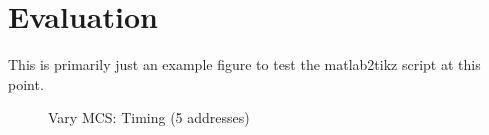 
\chapter{Evaluation}\label{ch:evaluation}

\glsresetall %


This is primarily just an example figure to test the matlab2tikz script at this point.\\

\begin{figure}[H]
	\centering
	\setlength\figureheight{5cm}
	\setlength{}
	
	\caption[vary\_mcs-timing-5\_addresses]{Vary MCS: Timing (5 addresses)}
	\label{fig:vary_mcs-timing-5_addresses}
\end{figure}
	